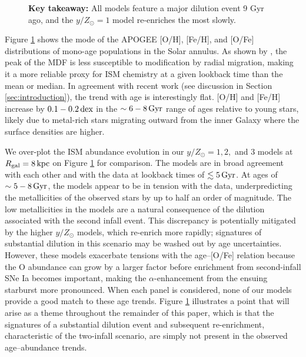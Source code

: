 \documentclass[twocolumn,twocolappendix,linenumbers]{aastex631}
\newcommand{\yZ}[1]{$y/Z_\odot=#1$}
\newcommand{\kpc}{\,{\rm kpc}}
\newcommand{\Gyr}{\,{\rm Gyr}}
\newcommand{\dex}{\,{\rm dex}}
\begin{document}
\begin{figure}
{    {\bf Key takeaway:} All models feature a major dilution event 9 Gyr ago, and the \yZ{1} model re-enriches the most slowly.}
    \label{fig:yield-outflow}
\end{figure}

Figure \ref{fig:yield-outflow} shows the mode of the APOGEE [O/H], [Fe/H], and [O/Fe] distributions of mono-age populations in the Solar annulus. As shown by \citet{johnson_milky_2024}, the peak of the MDF is less susceptible to modification by radial migration, making it a more reliable proxy for ISM chemistry at a given lookback time than the mean or median. In agreement with recent work (see discussion in Section \ref{sec:introduction}), the trend with age is interestingly flat. [O/H] and [Fe/H] increase by $0.1-0.2\dex$ in the $\sim6-8\Gyr$ range of ages relative to young stars, likely due to metal-rich stars migrating outward from the inner Galaxy where the surface densities are higher.

We over-plot the ISM abundance evolution in our $y/Z_\odot=1,2,$ and $3$ models at $R_{\rm gal}=8\kpc$ on Figure \ref{fig:yield-outflow} for comparison. The models are in broad agreement with each other and with the data at lookback times of $\lesssim5\Gyr$. At ages of $\sim5-8\Gyr$, the models appear to be in tension with the data, underpredicting the metallicities of the observed stars by up to half an order of magnitude. The low metallicities in the models are a natural consequence of the dilution associated with the second infall event. This discrepancy is potentially mitigated by the higher $y/Z_\odot$ models, which re-enrich more rapidly; signatures of substantial dilution in this scenario may be washed out by age uncertainties. However, these models exacerbate tensions with the age--[O/Fe] relation because the O abundance can grow by a larger factor before enrichment from second-infall SNe Ia becomes important, making the $\alpha$-enhancement from the ensuing starburst more pronounced. When each panel is considered, none of our models provide a good match to these age trends. Figure \ref{fig:yield-outflow} illustrates a point that will arise as a theme throughout the remainder of this paper, which is that the signatures of a substantial dilution event and subsequent re-enrichment, characteristic of the two-infall scenario, are simply not present in the observed age--abundance trends.
\end{document}
